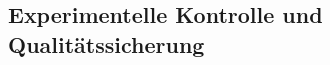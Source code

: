 \documentclass[11pt,a4paper]{article}
\begin{document}
    \subsection{Experimentelle Kontrolle und Qualitätssicherung}
\end{document}
